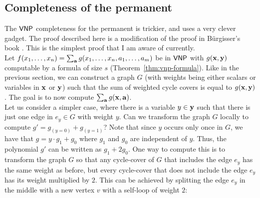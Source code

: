 \subsection{Completeness of the permanent}

The $\mathsf{VNP}$ completeness for the permanent is trickier, and uses a very clever gadget. The proof described here is a modification of the proof in B\"urgisser's book \cite{bur00}. This is the simplest proof that I am aware of currently. \\

Let $f(x_1,\dots, x_n) = \sum_{\mathbf{a}} g(x_1,\dots, x_n, a_1,\dots, a_m)$ be in $\mathsf{VNP}$ with $g(\mathbf{x}, \mathbf{y})$ computable by a formula of size $s$ (Theorem~\ref{thm:vnp-formula}). Like in the previous section, we can construct a graph $G$ (with weights being either scalars or variables in $\mathbf{x}$ or $\mathbf{y}$) such that the sum of weighted cycle covers is equal to $g(\mathbf{x}, \mathbf{y})$. The goal is to now compute $\sum_{\mathbf{a}} g(\mathbf{x}, \mathbf{a})$. \\

Let us consider a simpler case, where there is a variable $y \in \mathbf{y}$ such that there is just one edge in $e_y \in G$ with weight $y$. Can we transform the graph $G$ locally to compute $g' = g_{(y=0)} + g_{(y=1)}$? Note that since $y$ occurs only once in $G$, we have that $g = y \cdot g_1 + g_0$ where $g_1$ and $g_0$ are independent of $y$. Thus, the polynomial $g'$ can be written as $g_1 + 2 g_0$. One way to compute this is to transform the graph $G$ so that any cycle-cover of $G$ that includes the edge $e_y$ has the same weight as before, but every cycle-cover that does not include the edge $e_y$ has its weight multiplied by $2$. This can be achieved by splitting the edge $e_y$ in the middle with a new vertex $v$ with a self-loop of weight $2$:


